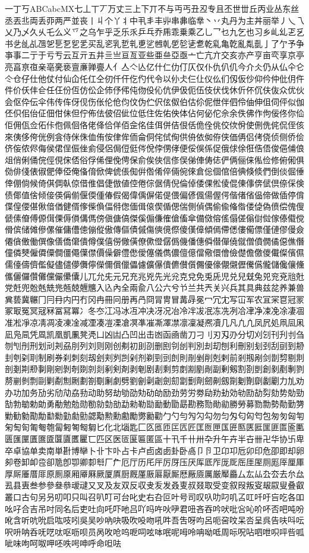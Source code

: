 一丁丂ABCabcMX七丄丅丆万丈三上下丌不与丏丐丑丒专且丕世丗丘丙业丛东丝丞丟丠両丢丣两严並丧丨丩个丫丬中丮丯丰丱串丳临丵丶丷丸丹为主丼丽举丿乀乁乂乃乄久乆乇么义乊之乌乍乎乏乐乑乒乓乔乕乖乗乘乙乚乛乜九乞也习乡乢乣乤乥书乧乨乩乪乫乬乭乮乯买乱乲乳乴乵乶乷乸乹乺乻乼乽乾乿亀亁亂亃亄亅了亇予争亊事二亍于亏亐云互亓五井亖亗亘亙亚些亜亝亞亟亠亡亢亣交亥亦产亨亩亪享京亭亮亯亰亱亲亳亴亵亶亷亸亹人亻亼亽亾亿什仁仂仃仄仅仆仇仈仉今介仌仍从仏仐仑仒仓仔仕他仗付仙仚仛仜仝仞仟仠仡仢代令以仦仧仨仩仪仫们仭仮仯仰仱仲仳仴仵件价仸仹仺任仼份仾仿伀企伂伃伄伅伆伇伈伉伊伋伌伍伎伏伐休伒伓伔伕伖众优伙会伛伜伝伞伟传伡伢伣伤伥伦伧伨伩伪伫伬伭伮伯估伱伲伳伴伵伶伷伸伹伺伻似伽伾伿佀佁佂佃佄佅但佇佈佉佊佋佌位低住佐佑佒体佔何佖佗佘余佚佛作佝佞佟你佡佢佣佤佥佦佧佨佩佪佫佬佭佮佯佰佱佲佳佴併佶佷佸佹佺佻佼佽佾使侀侁侂侃侄侅來侇侈侉侊例侌侍侎侏侐侑侒侓侔侕侖侗侘侙侚供侜依侞侟侠価侢侣侤侥侦侧侨侩侪侫侬侭侮侯侰侱侲侳侴侵侶侷侸侹侺侻侼侽侾便俀俁係促俄俅俆俇俈俉俊俋俌俍俎俏俐俑俒俓俔俕俖俗俘俙俚俛俜保俞俟俠信俢俣俤俥俦俧俨俩俪俫俬俭修俯俰俱俲俳俴俵俶俷俸俹俺俻俼俽俾俿倀倁倂倃倄倅倆倇倈倉倊個倌倍倎倏倐們倒倓倔倕倖倗倘候倚倛倜倝倞借倠倡倢倣値倥倦倧倨倩倪倫倬倭倮倯倰倱倲倳倴倵倶倷倸倹债倻值倽倾倿偀偁偂偃偄偅偆假偈偉偊偋偌偍偎偏偐偑偒偓偔偕偖偗偘偙做偛停偝偞偟偠偡偢偣偤健偦偧偨偩偪偫偬偭偮偯偰偱偲偳側偵偶偷偸偹偺偻偼偽偾偿傀傁傂傃傄傅傆傇傈傉傊傋傌傍傎傏傐傑傒傓傔傕傖傗傘備傚傛傜傝傞傟傠傡傢傣傤傥傦傧储傩傪傫催傭傮傯傰傱傲傳傴債傶傷傸傹傺傻傼傽傾傿僀僁僂僃僄僅僆僇僈僉僊僋僌働僎像僐僑僒僓僔僕僖僗僘僙僚僛僜僝僞僟僠僡僢僣僤僥僦僧僨僩僪僫僬僭僮僯僰僱僲僳僴僵僶僷僸價僺僻僼僽僾僿儀儁儂儃億儅儆儇儈儉儊儋儌儍儎儏儐儑儒儓儔儕儖儗儘儙儚儛儜儝儞償儠儡儢儣儤儥儦儧儨儩優儫儬儭儮儯儰儱儲儳儴儵儶儷儸儹儺儻儼儽儾儿兀允兂元兄充兆兇先光兊克兌免兎兏児兑兒兓兔兕兖兗兘兙党兛兜兝兞兟兠兡兢兣兤入兦內全兩兪八公六兮兯兰共兲关兴兵其具典兹兺养兼兽兾兿冀冁冂冃冄内円冇冈冉冊冋册再冎冏冐冑冒冓冔冕冖冗冘写冚军农冝冞冟冠冡冢冣冤冥冦冧冨冩冪冫冬冭冮冯冰冱冲决冴况冶冷冸冹冺冻冼冽冾冿净凁凂凃凄凅准凇凈凉凊凋凌凍凎减凐凑凒凓凔凕凖凗凘凙凚凛凜凝凞凟几凡凢凣凤凥処凧凨凩凪凫凬凭凮凯凰凱凲凳凴凵凶凷凸凹出击凼函凾凿刀刁刂刃刄刅分切刈刉刊刋刌刍刎刏刐刑划刓刔刕刖列刘则刚创刜初刞刟删刡刢刣判別刦刧刨利刪别刬刭刮刯到刱刲刳刴刵制刷券刹刺刻刼刽刾刿剀剁剂剃剄剅剆則剈剉削剋剌前剎剏剐剑剒剓剔剕剖剗剘剙剚剛剜剝剞剟剠剡剢剣剤剥剦剧剨剩剪剫剬剭剮副剰剱割剳剴創剶剷剸剹剺剻剼剽剾剿劀劁劂劃劄劅劆劇劈劉劊劋劌劍劎劏劐劑劒劓劔劕劖劗劘劙劚力劜劝办功加务劢劣劤劥劦劧动助努劫劬劭劮劯劰励劲劳労劵劶劷劸効劺劻劼劽劾势勀勁勂勃勄勅勆勇勈勉勊勋勌勍勎勏勐勑勒勓勔動勖勗勘務勚勛勜勝勞募勠勡勢勣勤勥勦勧勨勩勪勫勬勭勮勯勰勱勲勳勴勵勶勷勸勹勺勻勼勽勾勿匀匁匂匃匄包匆匇匈匉匊匋匌匍匎匏匐匑匒匓匔匕化北匘匙匚匛匜匝匞匟匠匡匢匣匤匥匦匧匨匩匪匫匬匭匮匯匰匱匲匳匴匵匶匷匸匹区医匼匽匾匿區十卂千卄卅卆升午卉半卋卌卍华协卐卑卒卓協单卖南単卙博卛卜卝卞卟占卡卢卣卤卥卦卧卨卩卪卫卬卭卮卯印危卲即却卵卶卷卸卹卺卻卼卽卾卿厀厁厂厃厄厅历厇厈厉厊压厌厍厎厏厐厑厒厓厔厕厖厗厘厙厚厛厜厝厞原厠厡厢厣厤厥厦厧厨厩厪厫厬厭厮厯厰厱厲厳厴厵厶厷厸厹厺去厼厽厾县叀叁参參叄叅叆叇又叉及友双反収叏叐发叒叓叔叕取受变叙叚叛叜叝叞叟叠叡叢口古句另叧叨叩只叫召叭叮可台叱史右叴叵叶号司叹叺叻叼叽叾叿吀吁吂吃各吅吆吇合吉吊吋同名后吏吐向吒吓吔吕吖吗吘吙吚君吜吝吞吟吠吡吢吣吤吥否吧吨吩吪含听吭吮启吰吱吲吳吴吵吶吷吸吹吺吻吼吽吾吿呀呁呂呃呄呅呆呇呈呉告呋呌呍呎呏呐呑呒呓呔呕呖呗员呙呚呛呜呝呞呟呠呡呢呣呤呥呦呧周呩呪呫呬呭呮呯呰呱呲味呴呵呶呷呸呹呺呻呼命呾呿